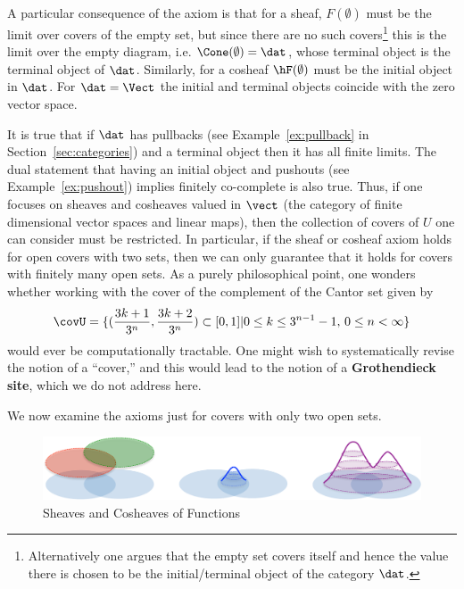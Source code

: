 A particular consequence of the axiom is that for a sheaf, $F(\emptyset)$ must be the limit over covers of the empty set, but since there are no such covers\footnote{Alternatively one argues that the empty set covers itself and hence the value there is chosen to be the initial/terminal object of the category $\dat$.} this is the limit over the empty diagram, i.e. $\Cone(\emptyset)=\dat$, whose terminal object is the terminal object of $\dat$. Similarly, for a cosheaf $\hF(\emptyset)$ must be the initial object in $\dat$. For $\dat=\Vect$ the initial and terminal objects coincide with the zero vector space.
	
It is true that if $\dat$ has pullbacks (see Example~\ref{ex:pullback} in Section~\ref{sec:categories}) and a terminal object then it has all finite limits. The dual statement that having an initial object and pushouts (see Example~\ref{ex:pushout}) implies finitely co-complete is also true. Thus, if one focuses on sheaves and cosheaves valued in $\vect$ (the category of finite dimensional vector spaces and linear maps), then the collection of covers of $U$ one can consider must be restricted. In particular, if the sheaf or cosheaf axiom holds for open covers with two sets, then we can only guarantee that it holds for covers with finitely many open sets. As a purely philosophical point, one wonders whether working with the cover of the complement of the Cantor set given by
\[
	\covU=\{(\frac{3k+1}{3^n},\frac{3k+2}{3^n})\subset[0,1] | 0\leq k\leq 3^{n-1}-1, \, 0\leq n<\infty\}
\]
would ever be computationally tractable. One might wish to systematically revise the notion of a ``cover,'' and this would lead to the notion of a \textbf{Grothendieck site}, which we do not address here.

We now examine the axioms just for covers with only two open sets.

\begin{figure}[ht]
\centering
\includegraphics[width=\textwidth]{fun_sheaves.pdf}
\caption{Sheaves and Cosheaves of Functions}
\label{fig:fun_sheaves}
\end{figure}

